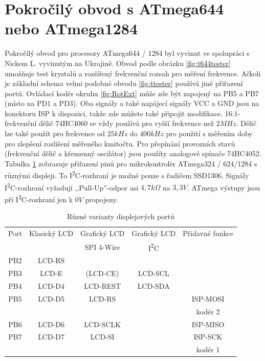 \section{Pokročilý obvod s ATmega644 nebo ATmega1284}

Pokročilý obvod pro procesory ATmega644 / 1284 byl vyvinut ve spolupráci s Nickem L.
vyvinutým na Ukrajině. Obvod podle obrázku \ref{fig:t644tester} umožňuje test krystalů a rozšířený
frekvenční rozsah pro měření frekvence.
Ačkoli je základní schema velmi podobné obvodu  \ref{fig:ttester} používá jiné přiřazení portů.
Ovládací kodér okruhu \ref{fig:RotExt} může zde být zapojený na PB5 a PB7 (místo na PD1 a PD3). 
Oba signály a také napájecí signály VCC a GND jsou na konektoru ISP k dispozici,
takže zde můžete také připojit modifikace.
16:1-frekvenční dělič 74HC4060 se vždy používá pro vyšší frekvence než \(2MHz\).
Dělič lze také použít pro frekvence od \(25kHz\) do \(400kHz\) pro použití s měřením
doby pro zlepšení rozlišení měřeného kmitočtu.
Pro přepínání provozních stavů (frekvenční dělič a křemenný oscilátor) jsou
použíty analogové spínače 74HC4052.
Tabulka \ref{tab:mega644-display} zobrazuje přiřazení pinů pro mikrokontrolér
ATmega324 / 624/1284 s různými displeji.
To I\textsuperscript{2}C-rozhraní je možné pouze s řadičem SSD1306.
Signály I\textsuperscript{2}C-rozhraní vyžadují ,,Pull-Up''-odpor asi \(4,7k\Omega\) na \(3,3V\).
ATmega výstupy jsou při I\textsuperscript{2}C-rozhraní jen k \(0V\) propojeny.
\begin{table}[H]
  \begin{center}
    \begin{tabular}{| c || c | c | c | c |}
    \hline
      Port & Klasický LCD &  Grafický LCD & Grafický LCD  & Přídavné funkce      \\
           &               &  SPI 4-Wire  &  I\textsuperscript{2}C         &                     \\
    \hline
    \hline
    PB2    &  LCD-RS         &            &             &       \\
    \hline
    PB3    &  LCD-E          & (LCD-CE)   &  LCD-SCL    &       \\
    \hline
    PB4    &  LCD-D4         & LCD-REST   &  LCD-SDA    &       \\
    \hline
    PB5    &  LCD-D5         & LCD-RS     &             & ISP-MOSI \\
           &                 &            &             & kodér 2 \\
    \hline
    PB6    &  LCD-D6         & LCD-SCLK   &             & ISP-MISO \\
    \hline
    PB7    &  LCD-D7         & LCD-SI     &             & ISP-SCK  \\
           &                 &            &             & kodér 1 \\
    \hline
    \end{tabular}
  \end{center}
  \caption{Různé varianty displejových portů}
  \label{tab:mega644-display}
\end{table}

